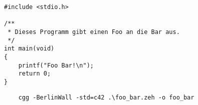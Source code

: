 \documentclass[fontsize=11pt, parskip=half]{scrartcl}
\begin{document}
 

%
\subtask{}
\lipsum[1][1-4]

\subtask{}
\lipsum[2][2-3]
\begin{verbatim}
#include <stdio.h>

/**
 * Dieses Programm gibt einen Foo an die Bar aus.
 */
int main(void)
{
    printf("Foo Bar!\n");
    return 0;
}
\end{verbatim}
 
\subtask{}
\lipsum[2][4]
%
\subtask{}
\lipsum[3][1-5]
%
\begin{verbatim}
    cgg -BerlinWall -std=c42 .\foo_bar.zeh -o foo_bar 
\end{verbatim}
%
\lipsum[3][6]
\end{document}
